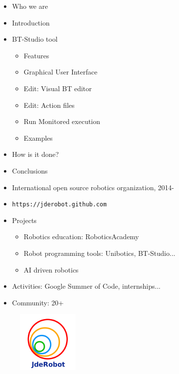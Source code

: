 \documentclass[notes,slidesec,a4]{seminar}
\title{\color{red}{BT-Studio: a ROS Behavior Tree webIDE}}
\author{Asociación de Robótica e Inteligencia Artificial JdeRobot}
\date{josemaria.plaza@gmail.com, oscar.robotics@tutanota.com, javizqh@gmail.com}
\begin{document}
\maketitle


\begin{hslide}
\begin{itemize}
\item Who we are
\item Introduction
\item BT-Studio tool
  \begin{itemize}
  \item Features
  \item Graphical User Interface
  \item Edit: Visual BT editor
  \item Edit: Action files
  \item Run Monitored execution
  \item Examples
  \end{itemize}
\item How is it done?
\item Conclusions
\end{itemize}
\end{hslide}

\begin{hslide}

\begin{minipage}[t]{8.8cm}
  \begin{itemize}
\item International open source robotics organization, 2014-
\item \texttt{https://jderobot.github.com}
\item Projects
  \begin{itemize}
  \item Robotics education: RoboticsAcademy
  \item Robot programming tools: Unibotics, BT-Studio...
  \item AI driven robotics
  \end{itemize}
\item Activities: Google Summer of Code, internships...
\item Community: 20+
\end{itemize}
\end{minipage}
\begin{minipage}[t]{3cm}
 \begin{figure}
      \includegraphics[width=3cm]{logo-jderobot.png}
 \end{figure}
\end{minipage}
\end{hslide}
\end{document}
